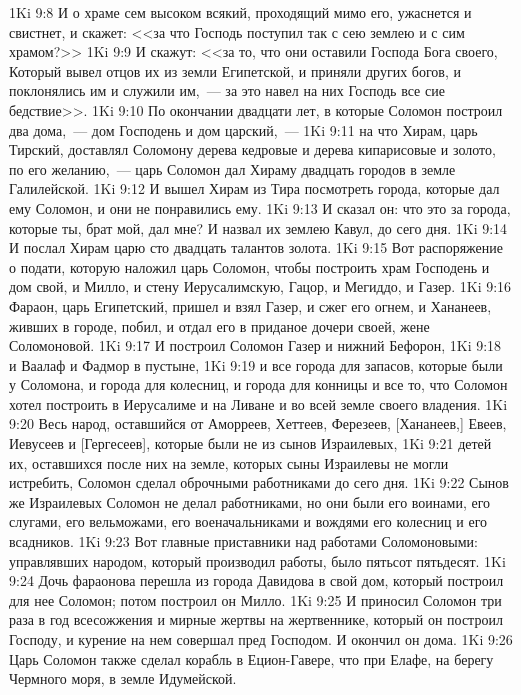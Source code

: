 \vs 1Ki 9:8 И о храме сем высоком всякий, проходящий мимо его, ужаснется и свистнет, и скажет: <<за что Господь поступил так с сею землею и с сим храмом?>>
\vs 1Ki 9:9 И скажут: <<за то, что они оставили Господа Бога своего, Который вывел отцов их из земли Египетской, и приняли других богов, и поклонялись им и служили им,~--- за это навел на них Господь все сие бедствие>>.
\vs 1Ki 9:10 По окончании двадцати лет, в которые Соломон построил два дома,~--- дом Господень и дом царский,~---
\vs 1Ki 9:11 на что Хирам, царь Тирский, доставлял Соломону дерева кедровые и дерева кипарисовые и золото, по его желанию,~--- царь Соломон дал Хираму двадцать городов в земле Галилейской.
\vs 1Ki 9:12 И вышел Хирам из Тира посмотреть города, которые дал ему Соломон, и они не понравились ему.
\vs 1Ki 9:13 И сказал он: что это за города, которые ты, брат мой, дал мне? И назвал их землею Кавул,  до сего дня.
\vs 1Ki 9:14 И послал Хирам царю сто двадцать талантов золота.
\vs 1Ki 9:15 Вот распоряжение о подати, которую наложил царь Соломон, чтобы построить храм Господень и дом свой, и Милло, и стену Иерусалимскую, Гацор, и Мегиддо, и Газер.
\rsbpar\vs 1Ki 9:16 Фараон, царь Египетский, пришел и взял Газер, и сжег его огнем, и Хананеев, живших в городе, побил, и отдал его в приданое дочери своей, жене Соломоновой.
\vs 1Ki 9:17 И построил Соломон Газер и нижний Бефорон,
\vs 1Ki 9:18 и Ваалаф и Фадмор в пустыне,
\vs 1Ki 9:19 и все города для запасов, которые были у Соломона, и города для колесниц, и города для конницы и все то, что Соломон хотел построить в Иерусалиме и на Ливане и во всей земле своего владения.
\vs 1Ki 9:20 Весь народ, оставшийся от Аморреев, Хеттеев, Ферезеев, [Хананеев,] Евеев, Иевусеев и [Гергесеев], которые были не из сынов Израилевых,
\vs 1Ki 9:21 детей их, оставшихся после них на земле, которых сыны Израилевы не могли истребить, Соломон сделал оброчными работниками до сего дня.
\vs 1Ki 9:22 Сынов же Израилевых Соломон не делал работниками, но они были его воинами, его слугами, его вельможами, его военачальниками и вождями его колесниц и его всадников.
\vs 1Ki 9:23 Вот главные приставники над работами Соломоновыми: управлявших народом, который производил работы, было пятьсот пятьдесят.
\vs 1Ki 9:24 Дочь фараонова перешла из города Давидова в свой дом, который построил для нее Соломон; потом построил он Милло.
\vs 1Ki 9:25 И приносил Соломон три раза в год всесожжения и мирные жертвы на жертвеннике, который он построил Господу, и курение на нем совершал пред Господом. И окончил он  дома.
\vs 1Ki 9:26 Царь Соломон также сделал корабль в Ецион-Гавере, что при Елафе, на берегу Чермного моря, в земле Идумейской.
